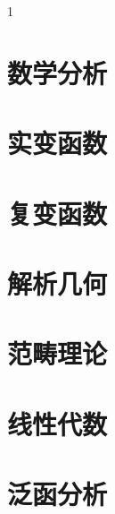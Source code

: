 \documentclass[12pt,oneside,a4paper]{book}
\begin{document}
\maketitle

\begin{spacing}{1}

\tableofcontents

\end{spacing}

\part{\kaishu 数学分析}



\part{\kaishu 实变函数}



\part{\kaishu 复变函数}



\part{\kaishu 解析几何}



\part{\kaishu 范畴理论}



\part{\kaishu 线性代数}



\part{\kaishu 泛函分析}


\end{document}
